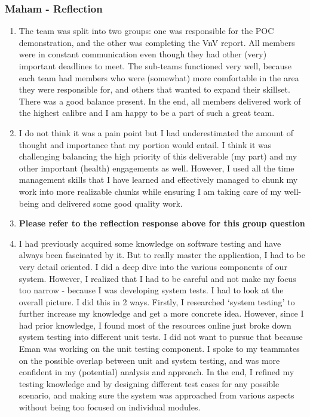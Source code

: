 \documentclass[12pt, titlepage]{article}
\begin{document}
\subsubsection*{Maham - Reflection}
\begin{enumerate}
  \item The team was split into two groups: one was responsible for the POC demonstration, and the other was completing the VnV report. All members were in constant communication even though they had other (very) important deadlines to meet. The sub-teams functioned very well, because each team had members who were (somewhat) more comfortable in the area they were responsible for, and others that wanted to expand their skillset. There was a good balance present. In the end, all members delivered work of the highest calibre and I am happy to be a part of such a great team.
  \item I do not think it was a pain point but I had underestimated the amount of thought and importance that my portion would entail. I think it was challenging balancing the high priority of this deliverable (my part) and my other important (health) engagements as well. However, I used all the time management skills that I have learned and effectively managed to chunk my work into more realizable chunks while ensuring I am taking care of my well-being and delivered some good quality work.
  \item \textbf{Please refer to the reflection response above for this group question}
  \item I had previously acquired some knowledge on software testing and have always been fascinated by it. But to really master the application, I had to be very detail oriented. I did a deep dive into the various components of our system. However, I realized that I had to be careful and not make my focus too narrow - because I was developing system tests. I had to look at the overall picture. I did this in 2 ways. Firstly, I researched ‘system testing’ to further increase my knowledge and get a more concrete idea. However, since I had prior knowledge, I found most of the resources online just broke down system testing into different unit tests. I did not want to pursue that because Eman was working on the unit testing component. I spoke to my teammates on the possible overlap between unit and system testing, and was more confident in my (potential) analysis and approach. In the end, I refined my testing knowledge and by designing different test cases for any possible scenario, and making sure the system was approached from various aspects without being too focused on individual modules. 
\end{enumerate}
\end{document}
